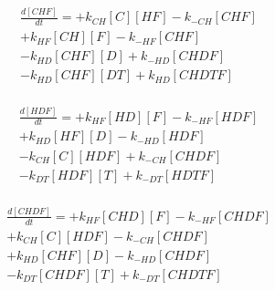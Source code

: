\begin{equation}
\begin{split}
\frac{d[CHF]}{dt} =   + k_{CH}[C][HF]  - k_{-CH}[CHF]     \\%
                      + k_{HF}[CH][F]  - k_{-HF}[CHF]     \\%
                      - k_{HD}[CHF][D]   + k_{-HD}[CHDF]    \\%
                      - k_{HD}[CHF][DT]   + k_{HD}[CHDTF]    \\%
\end{split}
\end{equation}

\begin{equation}
\begin{split}
\frac{d[HDF]}{dt} =   + k_{HF}[HD][F]  - k_{-HF}[HDF]     \\%
                      + k_{HD}[HF][D]  - k_{-HD}[HDF]     \\%
                      - k_{CH}[C][HDF]    + k_{-CH}[CHDF]     \\%
                      - k_{DT}[HDF][T]   + k_{-DT}[HDTF]    \\%
\end{split}
\end{equation}

\begin{equation}
\begin{split}
\frac{d[CHDF]}{dt} =  + k_{HF}[CHD][F]    - k_{-HF}[CHDF]     \\%
                      + k_{CH}[C][HDF]    - k_{-CH}[CHDF]     \\%
                      + k_{HD}[CHF][D]    - k_{-HD}[CHDF]     \\%
                      - k_{DT}[CHDF][T]   + k_{-DT}[CHDTF]    \\%
\end{split}
\end{equation}

